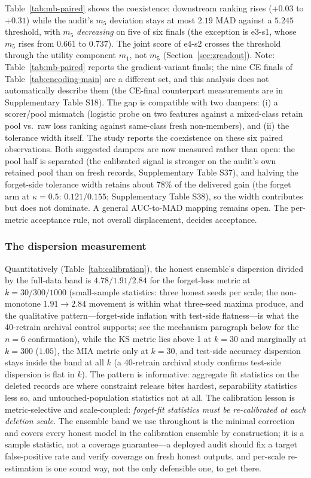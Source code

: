 \documentclass[lettersize,journal]{IEEEtran}
\begin{document}
Table~\ref{tab:mb-paired} shows the coexistence: downstream
ranking rises ($+0.03$ to $+0.31$) while the audit's $m_5$
deviation stays at most $2.19$ MAD against a $5.245$
threshold, with $m_5$ \emph{decreasing} on five of six finals (the exception is e3-s1, whose $m_5$ rises from $0.661$ to $0.737$). The joint score of e4-s2 crosses the threshold through the utility component $m_1$, not $m_5$ (Section~\ref{sec:zreadout}). Note: Table~\ref{tab:mb-paired} reports the gradient-variant finals; the nine CE finals of Table~\ref{tab:encoding-main} are a different set, and this analysis does not automatically describe them (the CE-final counterpart measurements are in Supplementary Table S18).
The gap is compatible with two dampers:
(i) a scorer/pool mismatch (logistic probe on two features
against a mixed-class retain pool vs.\ raw loss ranking
against same-class fresh non-members), and (ii) the tolerance
width itself. The study reports the coexistence on these six
paired observations. Both suggested dampers are now measured
rather than open: the pool half is separated (the calibrated
signal is stronger on the audit's own retained pool than on
fresh records, Supplementary Table S37), and halving the
forget-side tolerance width retains about $78\%$ of the
delivered gain (the forget arm at $\kappa{=}0.5$:
$0.121/0.155$; Supplementary Table S38), so the width
contributes but does not dominate. A general AUC-to-MAD
mapping remains open.
The per-metric acceptance rule, not overall displacement,
decides acceptance.


\subsubsection{The dispersion measurement}
\label{sec:dispmeas}
Quantitatively (Table~\ref{tab:calibration}), the honest ensemble's
dispersion divided by the full-data band is $4.78/1.91/2.84$ for the
forget-loss metric at $k = 30/300/1000$ (small-sample statistics:
three honest seeds per scale; the non-monotone $1.91\to2.84$
movement is within what three-seed maxima produce, and the
qualitative pattern---forget-side inflation with test-side
flatness---is what the 40-retrain archival control supports;
see the mechanism paragraph below for the $n{=}6$
confirmation),
while the KS metric
lies above 1 at $k{=}30$ and marginally at $k{=}300$ ($1.05$), the MIA
metric only at $k{=}30$, and test-side accuracy dispersion
stays inside the band at all $k$ (a 40-retrain archival study
confirms test-side dispersion is flat in $k$). The pattern is
informative: aggregate fit statistics on the deleted records are
where constraint release bites hardest, separability statistics
less so, and untouched-population statistics not at all. The
calibration lesson is metric-selective and
scale-coupled: \emph{forget-fit statistics must be re-calibrated
at each deletion scale}. The ensemble band we use throughout is
the minimal correction and covers every honest model in the
calibration ensemble by construction; it is a sample statistic, not
a coverage guarantee---a deployed audit should fix a target
false-positive rate and verify coverage on fresh honest outputs,
and per-scale re-estimation is one sound way, not the only
defensible one, to get there.
\end{document}
